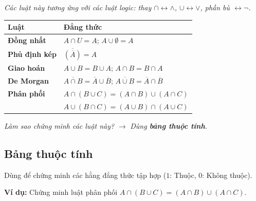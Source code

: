 \documentclass[12pt,a4paper]{article}
\begin{document}
\textit{Các luật này tương ứng với các luật logic: thay $\cap \leftrightarrow \land$, $\cup \leftrightarrow \lor$, phần bù $\leftrightarrow \neg$.}

\begin{center}
\renewcommand{\arraystretch}{1.3}
\begin{tabular}{ll}
\toprule
\textbf{Luật} & \textbf{Đẳng thức} \\
\midrule
\textbf{Đồng nhất} & $A \cap U = A$; \qquad $A \cup \emptyset = A$ \\
\textbf{Phủ định kép} & $\overline{(\overline{A})} = A$ \\
\textbf{Giao hoán} & $A \cup B = B \cup A$; \qquad $A \cap B = B \cap A$ \\
\textbf{De Morgan} & $\overline{A \cap B} = \overline{A} \cup \overline{B}$; \qquad $\overline{A \cup B} = \overline{A} \cap \overline{B}$ \\
\textbf{Phân phối} & $A \cap (B \cup C) = (A \cap B) \cup (A \cap C)$ \\
 & $A \cup (B \cap C) = (A \cup B) \cap (A \cup C)$ \\
\bottomrule
\end{tabular}
\end{center}

\textit{Làm sao chứng minh các luật này?} $\rightarrow$ \textit{Dùng \textbf{bảng thuộc tính}.}

\subsection{Bảng thuộc tính}

Dùng để chứng minh các hằng đẳng thức tập hợp ($1$: Thuộc, $0$: Không thuộc).

\textbf{Ví dụ:} Chứng minh luật phân phối $A \cap (B \cup C) = (A \cap B) \cup (A \cap C)$.
\end{document}
